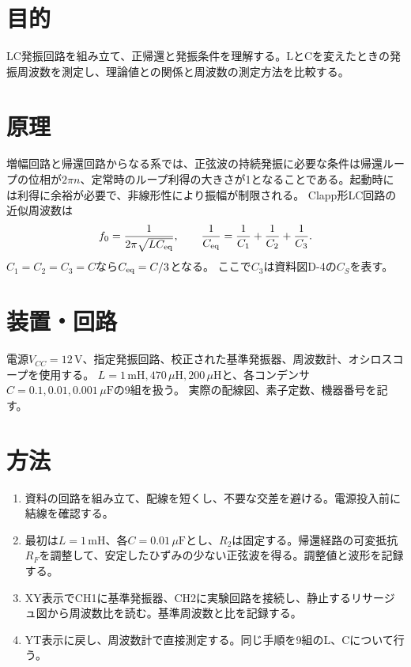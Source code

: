 \documentclass[lualatex,a4paper,10pt]{jlreq}
\begin{document}
\reporttitle
{}

\section{目的}\label{sec:auto1}
LC発振回路を組み立て、正帰還と発振条件を理解する。LとCを変えたときの発振周波数を測定し、理論値との関係と周波数の測定方法を比較する。
\section{原理}\label{sec:auto2}
増幅回路と帰還回路からなる系では、正弦波の持続発振に必要な条件は帰還ループの位相が$2\pi n$、定常時のループ利得の大きさが1となることである。起動時には利得に余裕が必要で、非線形性により振幅が制限される。
Clapp形LC回路の近似周波数は
\[
 f_0=\frac1{2\pi\sqrt{LC_{\rm eq}}},\qquad
 \frac1{C_{\rm eq}}=\frac1{C_1}+\frac1{C_2}+\frac1{C_3}.
\]
$C_1=C_2=C_3=C$なら$C_{\rm eq}=C/3$となる。
ここで$C_3$は資料図D-4の$C_S$を表す。
\section{装置・回路}\label{sec:auto3}
電源$V_{CC}=12\,\mathrm{V}$、指定発振回路、校正された基準発振器、周波数計、オシロスコープを使用する。
$L=1\,\mathrm{mH},470\,\mu\mathrm{H},200\,\mu\mathrm{H}$と、各コンデンサ$C=0.1,0.01,0.001\,\mu\mathrm{F}$の9組を扱う。
実際の配線図、素子定数、機器番号を記す。
\writing{25mm}
\section{方法}\label{sec:auto4}
\begin{enumerate}
\item 資料の回路を組み立て、配線を短くし、不要な交差を避ける。電源投入前に結線を確認する。
\item 最初は$L=1\,\mathrm{mH}$、各$C=0.01\,\mu\mathrm{F}$とし、$R_2$は固定する。帰還経路の可変抵抗$R_F$を調整して、安定したひずみの少ない正弦波を得る。調整値と波形を記録する。
\item XY表示でCH1に基準発振器、CH2に実験回路を接続し、静止するリサージュ図から周波数比を読む。基準周波数と比を記録する。
\item YT表示に戻し、周波数計で直接測定する。同じ手順を9組のL、Cについて行う。
\end{enumerate}
\clearpage
\end{document}
